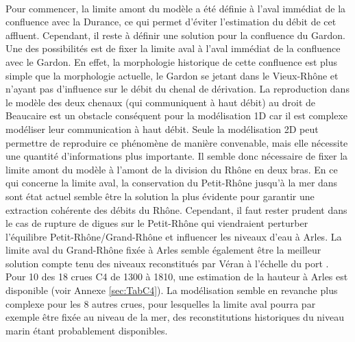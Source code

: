\documentclass[11pt]{article}
\begin{document}
	\paragraph{} Pour commencer, la limite amont du modèle a été définie à l'aval immédiat de la confluence avec la Durance, ce qui permet d'éviter l'estimation du débit de cet affluent. Cependant, il reste à définir une solution pour la confluence du Gardon. Une des possibilités est de fixer la limite aval à l'aval immédiat de la confluence avec le Gardon. En effet, la morphologie historique de cette confluence est plus simple que la morphologie actuelle, le Gardon se jetant dans le Vieux-Rhône et n'ayant pas d'influence sur le débit du chenal de dérivation. La reproduction dans le modèle des deux chenaux (qui communiquent à haut débit) au droit de Beaucaire est un obstacle conséquent pour la modélisation 1D car il est complexe modéliser leur communication à haut débit. Seule la modélisation 2D peut permettre de reproduire ce phénomène de manière convenable, mais elle nécessite une quantité d'informations plus importante. Il semble donc nécessaire de fixer la limite amont du modèle à l'amont de la division du Rhône en deux bras. En ce qui concerne la limite aval, la conservation du Petit-Rhône jusqu'à la mer dans sont état actuel semble être la solution la plus évidente pour garantir une extraction cohérente des débits du Rhône. Cependant, il faut rester prudent dans le cas de rupture de digues sur le Petit-Rhône qui viendraient perturber l'équilibre Petit-Rhône/Grand-Rhône et influencer les niveaux d'eau à Arles. La limite aval du Grand-Rhône fixée à Arles semble également être la meilleur solution compte tenu des niveaux reconstitués par Véran à l'échelle du port \citep{pichard_les_1995}. Pour 10 des 18 crues C4 de 1300 à 1810, une estimation de la hauteur à Arles est disponible (voir Annexe \ref{sec:TabC4}). La modélisation semble en revanche plus complexe pour les 8 autres crues, pour lesquelles la limite aval pourra par exemple être fixée au niveau de la mer, des reconstitutions historiques du niveau marin étant probablement disponibles.
	
\end{document}
